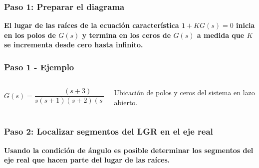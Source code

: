 \documentclass[aspectratio=169,handout]{beamer}
\newcommand*{\rootlocusexample}[2]{%
		\foreach \x in {-4,-3,-2,-1}
   		\draw (\x cm,1pt) -- (\x cm,-1pt) node[anchor=north] {$\x$};
		\foreach \y in {-1,1}
   		\draw (-1pt,\y cm) -- (1pt,\y cm) node[anchor=east] {$\y$};
		\draw [-latex] (-4.5,0) -- (1,0) node [above]  {$\sigma$};
		\draw [-latex] (0,#1) -- (0,#2) node [right] {$j\omega$};
		\node[pole,draw=black] at (0,0) {};
		\node[pole,draw=black] at (-1,0) {};
		\node[pole,draw=black] at (-2,0) {};
		\node[zero,draw=black] at (-3,0) {};
		\node[pole,draw=black] at (-4,0) {};
}
\theoremstyle{definition}
\theoremstyle{plain}
\theoremstyle{remark}
\begin{document}
\begin{frame}[c]\frametitle{Paso 1: Preparar el diagrama}
	\textbf{El lugar de las raíces de la ecuación característica $1 + KG(s)= 0$ inicia en los polos de $G(s)$ y termina en los ceros de $G(s)$ a medida que $K$ se incrementa desde cero hasta infinito.}
\end{frame}

\begin{frame}[<+->]\frametitle{Paso 1 - Ejemplo}
\begin{columns}
	\begin{column}{0.5\textwidth}
		\begin{equation*}
			G(s) = \frac{(s+3)}{s(s+1)(s+2)(s+4)}
		\end{equation*}
	\end{column}
	\begin{column}{0.5\textwidth}
	\centering
	Ubicación de polos y ceros del sistema en lazo abierto.
	\end{column}
\end{columns}
\end{frame}

\begin{frame}[c]\frametitle{Paso 2: Localizar segmentos del LGR en el eje real}
\centering
\textbf{Usando la condición de ángulo es posible determinar los segmentos del eje real que hacen parte del lugar de las raíces.}
\end{frame}
\end{document}
